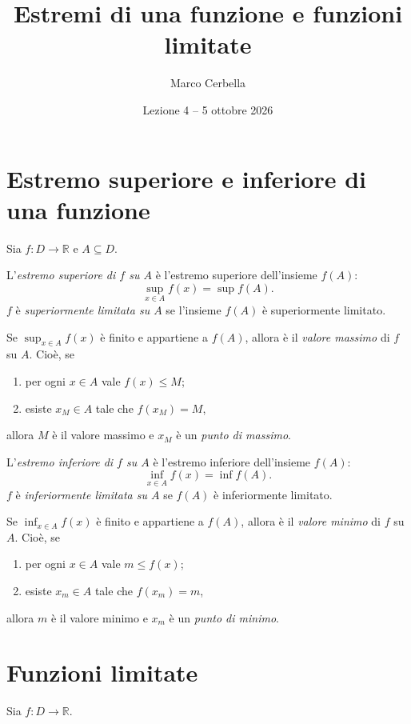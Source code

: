 \documentclass[11pt,a4paper]{article}
\title{Estremi di una funzione e funzioni limitate}
\author{Marco Cerbella}
\date{Lezione 4 -- 5 ottobre 2026}
\begin{document}
\maketitle

\section{Estremo superiore e inferiore di una funzione}

Sia $f : D \to \mathbb{R}$ e $A \subseteq D$.

\begin{definizione}
L'\emph{estremo superiore di $f$ su $A$} è l'estremo superiore dell'insieme $f(A)$:
\[
\sup_{x \in A} f(x) = \sup f(A).
\]
$f$ è \emph{superiormente limitata su $A$} se l'insieme $f(A)$ è superiormente limitato.
\end{definizione}

Se $\sup_{x \in A} f(x)$ è finito e appartiene a $f(A)$, allora è il \emph{valore massimo} di $f$ su $A$. Cioè, se
\begin{enumerate}
    \item per ogni $x \in A$ vale $f(x) \leq M$;
    \item esiste $x_M \in A$ tale che $f(x_M) = M$,
\end{enumerate}
allora $M$ è il valore massimo e $x_M$ è un \emph{punto di massimo}.

\begin{definizione}
L'\emph{estremo inferiore di $f$ su $A$} è l'estremo inferiore dell'insieme $f(A)$:
\[
\inf_{x \in A} f(x) = \inf f(A).
\]
$f$ è \emph{inferiormente limitata su $A$} se $f(A)$ è inferiormente limitato.
\end{definizione}

Se $\inf_{x \in A} f(x)$ è finito e appartiene a $f(A)$, allora è il \emph{valore minimo} di $f$ su $A$. Cioè, se
\begin{enumerate}
    \item per ogni $x \in A$ vale $m \leq f(x)$;
    \item esiste $x_m \in A$ tale che $f(x_m) = m$,
\end{enumerate}
allora $m$ è il valore minimo e $x_m$ è un \emph{punto di minimo}.

\section{Funzioni limitate}

Sia $f : D \to \mathbb{R}$.
\end{document}
